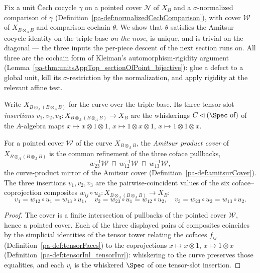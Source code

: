 Fix a unit \v Cech cocycle \(\gamma\) on a pointed cover \(\mathcal N\) of \(X_B\) and a
\(\sigma\)-normalized comparison of \(\gamma\)
(Definition~\ref{pa-def:normalizedCechComparison}), with cover \(\mathcal W\) of \(X_{B \otimes_A B}\)
and comparison cochain \(\theta\). We show that \(\theta\) satisfies the Amitsur cocycle identity on
the triple base \emph{on the nose}, is unique, and is trivial on the diagonal --- the three
inputs the per-piece descent of the next section runs on. All three are the cochain form of
Kleiman's automorphism-rigidity argument (Lemma~\ref{pa-thm:unitsAppTop_sectionOfPoint_bijective}):
glue a defect to a global unit, kill its \(\sigma\)-restriction by the normalization, and apply
rigidity at the relevant affine test.

Write \(X_{B \otimes_A (B \otimes_A B)}\) for the curve over the triple base. Its three
tensor-slot \emph{insertions} \(v_1, v_2, v_3 \colon X_{B \otimes_A (B \otimes_A B)} \to X_B\) are
the whiskerings \(C \lhd (\Spec\ \text{of})\) of the \(A\)-algebra maps \(x \mapsto x \otimes 1
\otimes 1\), \(x \mapsto 1 \otimes x \otimes 1\), \(x \mapsto 1 \otimes 1 \otimes x\).

\begin{definition}
  \label{pa-def:amitsurProductCover}
  \leanok

  For a pointed cover \(\mathcal W\) of the curve \(X_{B \otimes_A B}\), the \emph{Amitsur product
  cover} of \(X_{B \otimes_A (B \otimes_A B)}\) is the common refinement of the three coface
  pullbacks,
  \[
    w_{23}^{-1}\mathcal W \ \sqcap\ w_{12}^{-1}\mathcal W \ \sqcap\ w_{13}^{-1}\mathcal W ,
  \]
  the curve-product mirror of the Amitsur cover (Definition~\ref{pa-def:amitsurCover}). The three
  insertions \(v_1, v_2, v_3\) are the pairwise-coincident values of the six coface--coprojection
  composites \(w_{ij} \circ u_k \colon X_{B \otimes_A (B \otimes_A B)} \to X_B\):
  \[
    v_1 = w_{12} \circ u_1 = w_{13} \circ u_1, \quad
    v_2 = w_{23} \circ u_1 = w_{12} \circ u_2, \quad
    v_3 = w_{23} \circ u_2 = w_{13} \circ u_2 .
  \]
\end{definition}
\begin{proof}
  \leanok
  The cover is a finite intersection of pullbacks of the pointed cover \(\mathcal W\), hence a
  pointed cover. Each of the three displayed pairs of composites coincides by the simplicial
  identities of the tensor tower relating the cofaces \(f_{ij}\) (Definition~\ref{pa-def:tensorFaces})
  to the coprojections \(x \mapsto x \otimes 1\), \(x \mapsto 1 \otimes x\)
  (Definition~\ref{pa-def:tensorInl_tensorInr}): whiskering to the curve preserves those equalities,
  and each \(v_i\) is the whiskered \(\Spec\) of one tensor-slot insertion.
\end{proof}

